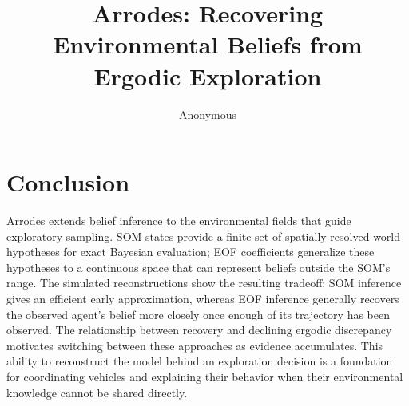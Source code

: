 \message{ !name(root.tex)}\documentclass[letterpaper,10pt,conference]{ieeeconf}
\title{\LARGE \bf
Arrodes: Recovering Environmental Beliefs from Ergodic Exploration
}
\author{Anonymous}
\begin{document}
\section{Conclusion}

Arrodes extends belief inference to the environmental fields that guide exploratory sampling. SOM states provide a finite set of spatially resolved world hypotheses for exact Bayesian evaluation; EOF coefficients generalize these hypotheses to a continuous space that can represent beliefs outside the SOM's range. The simulated reconstructions show the resulting tradeoff: SOM inference gives an efficient early approximation, whereas EOF inference generally recovers the observed agent's belief more closely once enough of its trajectory has been observed. The relationship between recovery and declining ergodic discrepancy motivates switching between these approaches as evidence accumulates. This ability to reconstruct the model behind an exploration decision is a foundation for coordinating vehicles and explaining their behavior when their environmental knowledge cannot be shared directly.

\balance





\end{document}
